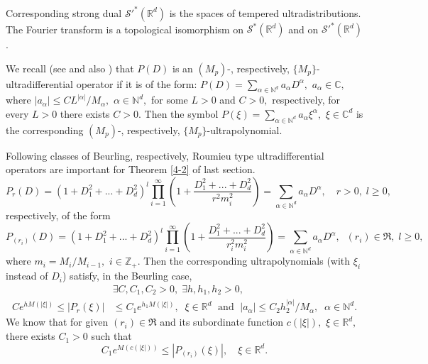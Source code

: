 \documentclass[sn-mathphys,Numbered]{sn-jnl}%
\theoremstyle{thmstyleone}%
\theoremstyle{thmstyletwo}%
\theoremstyle{thmstylethree}%
\begin{document}
Corresponding strong dual $\mathcal{S}'^*(\mathbb{R}^d)$ is the spaces of tempered ultradistributions. The Fourier transform is a topological isomorphism on $\mathcal{S}^*(\mathbb{R}^d)$ and on $\mathcal{S}'^*(\mathbb{R}^d)$.

We recall (see \cite{Komatsu1} and also \cite{KMMP}) that $P(D)$ is an $(M_p)$-, respectively, $\{M_p\}$-ultradifferential operator if it is of the form: $P(D)=\sum_{\alpha\in\mathbb{N}^d}a_\alpha D^\alpha,$ $a_\alpha\in\mathbb{C},$ where $|a_\alpha|\leq CL^{|\alpha|}/M_\alpha,$ $\alpha\in \mathbb{N}^d,$ for some $L>0$ and $C>0,$ respectively, for every $L>0$ there exists $C>0$.  Then the symbol $P(\xi)=\sum_{\alpha\in\mathbb{N}^d}a_\alpha \xi^\alpha,$ $\xi\in\mathbb{C}^d$ is the corresponding $(M_p)$-, respectively, $\{M_p\}$-ultrapolynomial.  

Following classes of Beurling, respectively, Roumieu type ultradifferential operators are important for Theorem \ref{4-2} of last section.
\begin{equation*}\label{z}
P_r(D)=(1+D_1^2+...+D_d^2)^l\prod_{i=1}^\infty\left(1+\frac{D^2_1+... +D^2_d}{r^2m_i^{2}}\right)=\sum_{\alpha\in\mathbb{N}^d}a_\alpha D^\alpha, \quad r>0, \; l\geq 0,
\end{equation*}
respectively,  of the form 
\begin{equation*}\label{zv}
P_{(r_i)}(D)=(1+D_1^2+...+D_d^2)^l\prod_{i=1}^\infty\left(1+\frac{D^2_1+... +D^2_d}{r_i^2m_i^2}\right)=\sum_{\alpha\in\mathbb{N}^d}a_\alpha D^\alpha, \;\;(r_i)\in\mathfrak R, \;l\geq 0,
\end{equation*}
where $m_i=M_i/M_{i-1},$ $i\in\mathbb{Z}_+.$ Then  the  corresponding ultrapolynomials (with $\xi_i$ instead of $D_i$) satisfy, in the Beurling case, 
\begin{align*} %
&\exists C, C_1, C_2>0, \;\exists h, h_1, h_2>0,\\
Ce^{hM(|\xi|)}\leq |P_r(\xi)|&\leq C_1 e^{ h_1M(|\xi|)},  \;\; \xi\in\mathbb R^d 
\;\mbox{ and }\; |a_\alpha|\leq C_2 h_2^{|\alpha|}/M_\alpha, \;\;\alpha\in\mathbb N^d.
\end{align*}
We know that  for given $(r_i)\in\mathfrak{R}$  and its subordinate function  $c(|\xi|),$ $\xi\in \mathbb R^d,$ there exists $C_1>0$ such that 
\begin{equation*}\label{vazno6}
C_1e^{M(c(|\xi|))}\leq |P_{(r_i)}(\xi)|, \quad\xi\in\mathbb R^d.
\end{equation*}
\end{document}
